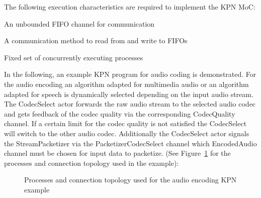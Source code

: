 
The following execution characteristics are required to
implement the KPN MoC:

\begin{characteristic}\label{characteristic-kpn-fifo}
  An unbounded FIFO channel for communication
\end{characteristic}

\begin{characteristic}\label{characteristic-kpn-fifo-read-write}
  A communication method to read from and write to FIFOs
\end{characteristic}

\begin{characteristic}\label{characteristic-kpn-concurrent-processes}
  Fixed set of concurrently executing processes
\end{characteristic}

In the following, an example KPN program for audio coding
is demonstrated. For the audio encoding an algorithm
adapted for multimedia audio or an algorithm adapted for speech
is dynamically selected depending on the input audio stream.
The CodecSelect actor forwards the raw audio stream to the
selected audio codec and gets feedback of the codec quality
via the corresponding CodecQuality channel. If a certain
limit for the codec quality is not satisfied the CodecSelect will
switch to the other audio codec. Additionally the CodecSelect actor
signals the StreamPacketizer via the PacketizerCodecSelect channel
which EncodedAudio channel must be chosen for input data to packetize.
(See Figure~\ref{fig:media-speech-audio-coding}
for the processes and connection topology used in the example):

\begin{figure}[h]
\centering

\caption{Processes and connection topology used for the audio encoding KPN example}
\label{fig:media-speech-audio-coding}
\end{figure}

